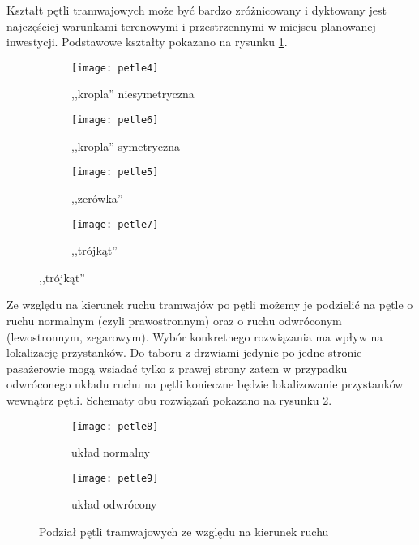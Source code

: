 \documentclass[twoside,12pt]{article}
\begin{document}
	Kształt pętli tramwajowych może być bardzo zróżnicowany i dyktowany jest najczęściej warunkami terenowymi i przestrzennymi w miejscu planowanej inwestycji. Podstawowe kształty pokazano na rysunku \ref{petle2}.
	
	\begin{figure}[H]	
	\centering
	\caption{Podział pętli tramwajowych ze względu na kształt}
	\begin{subfigure}{.25\textwidth}
	  \centering
	  \texttt{[image: petle4]}
	  \caption{,,kropla'' niesymetryczna}
	\end{subfigure}%
	\begin{subfigure}{.25\textwidth}
	  \centering
	  \texttt{[image: petle6]}
	  \caption{,,kropla'' symetryczna}
	\end{subfigure}%
	\begin{subfigure}{.25\textwidth}
	  \centering
	  \texttt{[image: petle5]}
	  \caption{,,zerówka''}
	\end{subfigure}%
		\begin{subfigure}{.25\textwidth}
	  \centering
	  \texttt{[image: petle7]}
	  \caption{,,trójkąt''}
	\end{subfigure}

	\label{petle2}
	\end{figure}
	
	Ze względu na kierunek ruchu tramwajów po pętli możemy je podzielić na pętle o ruchu normalnym (czyli prawostronnym) oraz o ruchu odwróconym (lewostronnym, zegarowym). Wybór konkretnego rozwiązania ma wpływ na lokalizację przystanków. Do taboru z drzwiami jedynie po jedne stronie pasażerowie mogą wsiadać tylko z prawej strony zatem w przypadku odwróconego układu ruchu na pętli konieczne będzie lokalizowanie przystanków wewnątrz pętli. Schematy obu rozwiązań pokazano na rysunku \ref{petle3}.
	
	\begin{figure}[H]	
	\centering
	\begin{subfigure}{.33\textwidth}
	  \centering
	  \texttt{[image: petle8]}
	  \caption{układ normalny}
	\end{subfigure}%
	\begin{subfigure}{.33\textwidth}
	  \centering
	  \texttt{[image: petle9]}
	  \caption{układ odwrócony}
	\end{subfigure}

	\caption{Podział pętli tramwajowych ze względu na kierunek ruchu}
	\label{petle3}
	\end{figure}
	
\end{document}
